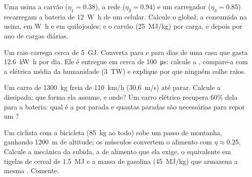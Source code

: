 \begin{exercise}[$\star\star\star$]\label{exo:g10:energy-conservation:12}
Uma usina a carvão ($\eta_1 = 0.38$), a rede ($\eta_2 = 0.94$) e um
carregador ($\eta_3 = 0.85$) recarregam a bateria de \qty{12}{W.h} de um
celular. Calcule o  global; a  consumida na
usina, em \unit{W.h} e em quilojoules; e o carvão (\qty{25}{MJ/kg}) por
carga, e depois por ano de cargas diárias.
\end{exercise}

\begin{exercise}[$\star\star\star$]\label{exo:g10:energy-conservation:13}
Um raio carrega cerca de \qty{5}{GJ}. Converta para  e
para dias de uma casa que gasta \qty{12.6}{kW.h} por dia. Ele é entregue
em cerca de \qty{100}{\micro s}: calcule a , compare-a com a
 elétrica média da humanidade (\qty{3}{TW}) e explique por que
ninguém colhe raios.
\end{exercise}

\begin{exercise}[$\star\star\star$]\label{exo:g10:energy-conservation:14}
Um carro de \qty{1300}{kg} freia de \qty{110}{km/h} (\qty{30.6}{m/s})
até parar. Calcule a  dissipada; que forma ela assume, e
onde? Um carro elétrico recupera $60\%$ dela para a bateria: qual é a
 por parada e quantas paradas são necessárias para repor um
?
\end{exercise}

\begin{exercise}[$\star\star\star$]\label{exo:g10:energy-conservation:15}
Um ciclista com a bicicleta (\qty{85}{kg} ao todo) sobe um passo de
montanha, ganhando \qty{1200}{m} de altitude; os músculos convertem o
alimento com $\eta \approx 0.25$. Calcule a  mecânica da subida, a
 de alimento que ela exige, o equivalente em tigelas de cereal de
\qty{1.5}{MJ} e a massa de gasolina (\qty{45}{MJ/kg}) que armazena a
mesma . Comente.
\end{exercise}

